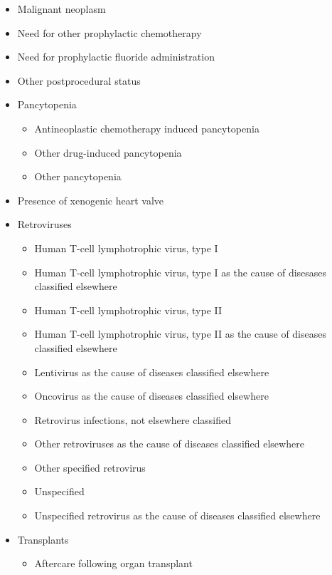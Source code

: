 \begin{itemize}
    \item Malignant neoplasm
    
    \item Need for other prophylactic chemotherapy
    \item Need for prophylactic fluoride administration
    \item Other postprocedural status
    
    \item Pancytopenia
    \begin{itemize}
        \item Antineoplastic chemotherapy induced pancytopenia
        \item Other drug-induced pancytopenia
        \item Other pancytopenia
    \end{itemize}
    
    \item Presence of xenogenic heart valve
    
    \item Retroviruses
    \begin{itemize}
        \item Human T-cell lymphotrophic virus, type I
        \item Human T-cell lymphotrophic virus, type I as the cause of disesases classified elsewhere
        \item Human T-cell lymphotrophic virus, type II
        \item Human T-cell lymphotrophic virus, type II as the cause of diseases classified elsewhere
        \item Lentivirus as the cause of diseases classified elsewhere
        \item Oncovirus as the cause of diseases classified elsewhere
        \item Retrovirus infections, not elsewhere classified
        \item Other retroviruses as the cause of diseases classified elsewhere
        \item Other specified retrovirus
        \item Unspecified
        \item Unspecified retrovirus as the cause of diseases classified elsewhere
    \end{itemize}
    
    \item Transplants
    \begin{itemize}
        \item Aftercare following organ transplant
        

\end{itemize}
\end{itemize}
